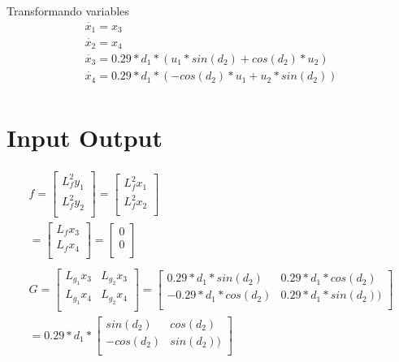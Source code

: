 \documentclass[varwidth,margin=3mm]{standalone}
\begin{document}
Transformando variables
\begin{gather*}
	\dot{x_1} = x_3\\
	\dot{x_2} = x_4\\
	\dot{x_3} = 0.29*d_1*(u_1*sin(d_2) + cos(d_2)*u_2)\\
	\dot{x_4} = 0.29*d_1*(-cos(d_2)*u_1 + u_2*sin(d_2))\\
\end{gather*}

\section{Input Output}
\begin{gather*}
	f = \left [ \begin{matrix}
			L_f^2y_1\\
			L_f^2y_2\\
	\end{matrix}
	\right ]
	= \left [ \begin{matrix}
			L_f^2x_1\\
			L_f^2x_2\\
	\end{matrix}
	\right ]\\
	= \left [ \begin{matrix}
			L_fx_3\\
			L_fx_4\\
	\end{matrix}
	\right ]
	= \left [ \begin{matrix}
			0\\
			0\\
	\end{matrix}
	\right ]\\\\
	G = \left [ \begin{matrix}
			L_{g_1}x_3 & L_{g_2}x_3\\
			L_{g_1}x_4 & L_{g_2}x_4\\
	\end{matrix}
	\right ]
	= \left [ \begin{matrix}
			0.29*d_1*sin(d_2) & 0.29*d_1*cos(d_2)\\
			-0.29*d_1*cos(d_2) & 0.29*d_1*sin(d_2))\\
	\end{matrix}
	\right ]\\
	= 0.29*d_1* \left [ \begin{matrix}
			sin(d_2) & cos(d_2)\\
			-cos(d_2) & sin(d_2))\\
	\end{matrix}
	\right ]
\end{gather*}
\end{document}
